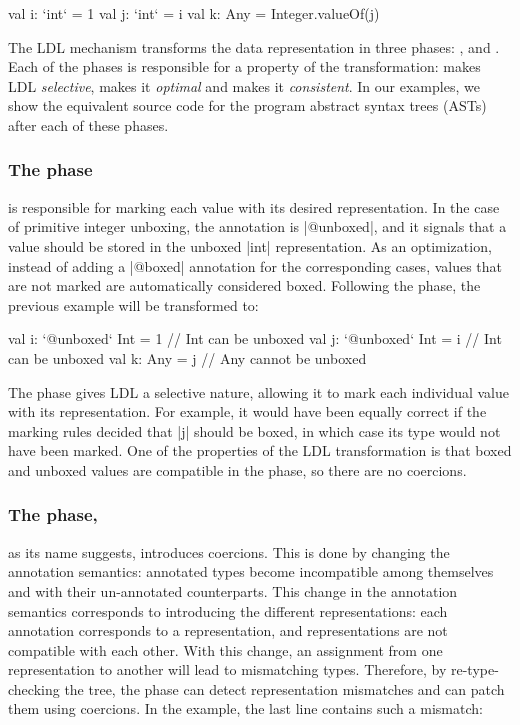 \begin{lstlisting-nobreak}
val i: `int` = 1
val j: `int` = i
val k: Any = Integer.valueOf(j)
\end{lstlisting-nobreak}

The LDL mechanism transforms the data representation in three phases:
\inject{}, \coerce{} and \commit{}. Each of the phases is responsible
for a property of the transformation: \inject{} makes LDL
\emph{selective}, \coerce{} makes it \emph{optimal} and \commit{}
makes it \emph{consistent}. In our examples, we show the equivalent
source code for the program abstract syntax trees (ASTs) after each of
these phases.

\subsubsection{The \inject{} phase} is responsible for marking each value with its desired representation. In the case of primitive integer unboxing, the annotation is |@unboxed|, and it signals that a value should be stored in the unboxed |int| representation. As an optimization, instead of adding a |@boxed| annotation for the corresponding cases, values that are not marked are automatically considered boxed. Following the \inject{} phase, the previous example will be transformed to:

\begin{lstlisting-nobreak}
val i: `@unboxed` Int = 1 // Int can be unboxed
val j: `@unboxed` Int = i // Int can be unboxed
val k: Any = j                  // Any cannot be unboxed
\end{lstlisting-nobreak}

The \inject{} phase gives LDL a selective nature, allowing it to mark
each individual value with its representation. For example, it would
have been equally correct if the marking rules decided that |j| should
be boxed, in which case its type would not have been marked. One of
the properties of the LDL transformation is that boxed and unboxed
values are compatible in the \inject{} phase, so there are no coercions.

\subsubsection{The \coerce{} phase,} as its name suggests, introduces coercions. This is done by changing the annotation semantics: annotated types become incompatible among themselves and with their un-annotated counterparts. This change in the annotation semantics corresponds to introducing the different representations: each annotation corresponds to a representation, and representations are not compatible with each other. With this change, an assignment from one representation to another will lead to mismatching types. Therefore, by re-type-checking the tree, the \coerce{} phase can detect representation mismatches and can patch them using coercions. In the example, the last line contains such a mismatch:

